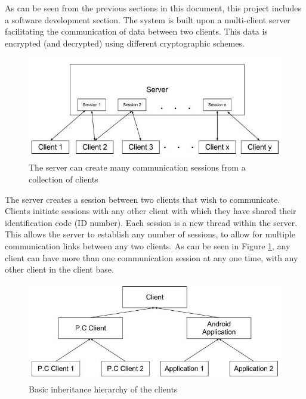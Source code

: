 \documentclass[a4paper,11pt]{article}
\begin{document}
As can be seen from the previous sections in this document, this project includes a software development section. The system is built upon a multi-client server facilitating the communication of data between two clients.  This data is encrypted (and decrypted) using different cryptographic schemes.

\begin{figure}[htb]
\centering
\includegraphics[scale=0.35]{designs1.jpg}
\caption{The server can create many communication sessions from a collection of clients}
\label{fig:designs1}
\end{figure}

The server creates a session between two clients that wish to communicate. Clients initiate sessions with any other client with which they have shared their identification code (ID number). Each session is a new thread within the server. This allows the server to establish any number of sessions, to allow for multiple communication links between any two clients. As can be seen in Figure \ref{fig:designs1}, any client can have more than one communication session at any one time, with any other client in the client base.

\begin{figure}[htb]
\centering
\includegraphics[scale=0.35]{designs2.jpg}
\caption{Basic inheritance hierarchy of the clients}
\label{fig:designs2}
\end{figure}
\end{document}
